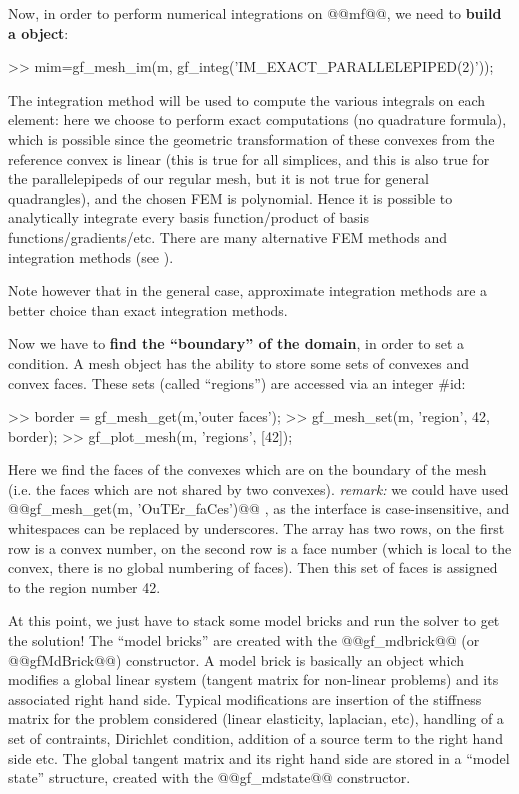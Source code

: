 Now, in order to perform numerical integrations on @@mf@@, we need to \textbf{build a \tmim object}:
\begin{matlab}
>> mim=gf_mesh_im(m, gf\_integ('IM_EXACT_PARALLELEPIPED(2)'));
\end{matlab}
The integration method will be used to compute the various integrals on each element: here we
choose to perform exact computations (no quadrature formula), which is possible
since the geometric transformation of these convexes from the reference convex
is linear (this is true for all simplices, and this is also true for
the parallelepipeds of our regular mesh, but it is not true for general
quadrangles), and the chosen FEM is polynomial. Hence it is possible to
analytically integrate every basis function/product of basis
functions/gradients/etc. There are many alternative FEM methods and
integration methods (see ). 

Note however that in the general case, approximate integration methods
are a better choice than exact integration methods.

Now we have to \textbf{find the ``boundary'' of the domain}, in order to set a 
condition. A mesh object has the ability to store some sets of convexes and convex faces. These sets (called ``regions'') are accessed via an integer \#id:
\begin{matlab}
>> border = gf_mesh_get(m,'outer faces');
>> gf_mesh_set(m, 'region', 42, border); %
>> gf_plot_mesh(m, 'regions', [42]); %
\end{matlab}
Here we find the faces of the convexes which are on the boundary of
the mesh (i.e. the faces which are not shared by two convexes). \textit{remark:} 
we could have used @@gf_mesh_get(m, 'OuTEr_faCes')@@ , as the
interface is case-insensitive, and whitespaces can be replaced by
underscores. The array  has two rows, on the first row is a
convex number, on the second row is a face number (which is local to the
convex, there is no global numbering of faces). Then this set of faces
is assigned to the region number 42.

At this point, we just have to stack some model bricks and run the
solver to get the solution! The ``model bricks'' are
created with the @@gf\_mdbrick@@ (or @@gfMdBrick@@) constructor. A
model brick is basically an object which modifies a global linear
system (tangent matrix for non-linear problems) and its associated
right hand side.  Typical modifications are insertion of the stiffness
matrix for the problem considered (linear elasticity, laplacian, etc),
handling of a set of contraints, Dirichlet condition, addition of a
source term to the right hand side etc. The global tangent matrix and
its right hand side are stored in a ``model state''
structure, created with the @@gf_mdstate@@ constructor.


